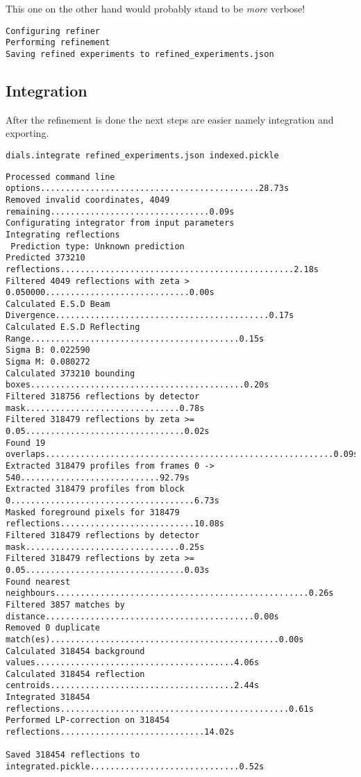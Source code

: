 \documentclass[a4paper, 11pt]{article}
\begin{document}
\noindent
This one on the other hand would probably stand to be \emph{more} verbose!

{\small
\begin{verbatim}
Configuring refiner
Performing refinement
Saving refined experiments to refined_experiments.json
\end{verbatim}
}

\subsection{Integration}

After the refinement is done the next steps are easier namely
integration and exporting.


{\small
\begin{verbatim}
dials.integrate refined_experiments.json indexed.pickle 
\end{verbatim}
}

{\small
\begin{verbatim}
Processed command line options............................................28.73s
Removed invalid coordinates, 4049 remaining................................0.09s
Configurating integrator from input parameters
Integrating reflections
 Prediction type: Unknown prediction
Predicted 373210 reflections...............................................2.18s
Filtered 4049 reflections with zeta > 0.050000.............................0.00s
Calculated E.S.D Beam Divergence...........................................0.17s
Calculated E.S.D Reflecting Range..........................................0.15s
Sigma B: 0.022590
Sigma M: 0.080272
Calculated 373210 bounding boxes...........................................0.20s
Filtered 318756 reflections by detector mask...............................0.78s
Filtered 318479 reflections by zeta >= 0.05................................0.02s
Found 19 overlaps..........................................................0.09s
Extracted 318479 profiles from frames 0 -> 540............................92.79s
Extracted 318479 profiles from block 0.....................................6.73s
Masked foreground pixels for 318479 reflections...........................10.08s
Filtered 318479 reflections by detector mask...............................0.25s
Filtered 318479 reflections by zeta >= 0.05................................0.03s
Found nearest neighbours...................................................0.26s
Filtered 3857 matches by distance..........................................0.00s
Removed 0 duplicate match(es)..............................................0.00s
Calculated 318454 background values........................................4.06s
Calculated 318454 reflection centroids.....................................2.44s
Integrated 318454 reflections..............................................0.61s
Performed LP-correction on 318454 reflections.............................14.02s

Saved 318454 reflections to integrated.pickle..............................0.52s
\end{verbatim}
}
\end{document}
